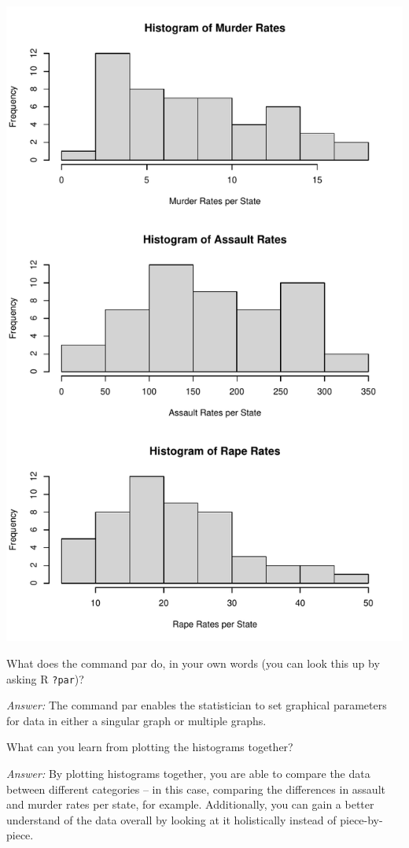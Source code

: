 \documentclass[
]{article}
\begin{document}
\includegraphics{Journal_files/figure-latex/unnamed-chunk-8-1.pdf}

What does the command par do, in your own words (you can look this up by
asking R \texttt{?par})?

\emph{Answer:} The command par enables the statistician to set graphical
parameters for data in either a singular graph or multiple graphs.

What can you learn from plotting the histograms together?

\emph{Answer:} By plotting histograms together, you are able to compare
the data between different categories -- in this case, comparing the
differences in assault and murder rates per state, for example.
Additionally, you can gain a better understand of the data overall by
looking at it holistically instead of piece-by-piece.
\end{document}
